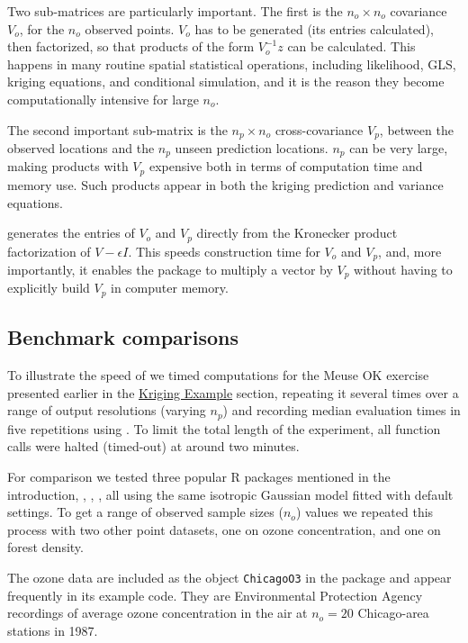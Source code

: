 Two sub-matrices are particularly important. The first is the \(n_o \times n_o\) covariance \(V_o\), for the \(n_o\) observed points. \(V_o\) has to be generated (its entries calculated), then factorized, so that products of the form \(V_o^{-1} z\) can be calculated. This happens in many routine spatial statistical operations, including likelihood, GLS, kriging equations, and conditional simulation, and it is the reason they become computationally intensive for large \(n_o\).

The second important sub-matrix is the \(n_p \times n_o\) cross-covariance \(V_p\), between the observed locations and the \(n_p\) unseen prediction locations. \(n_p\) can be very large, making products with \(V_p\) expensive both in terms of computation time and memory use. Such products appear in both the kriging prediction and variance equations.

 generates the entries of \(V_o\) and \(V_p\) directly from the Kronecker product factorization of \(V - \epsilon I\). This speeds construction time for \(V_o\) and \(V_p\), and, more importantly, it enables the package to multiply a vector by \(V_p\) without having to explicitly build \(V_p\) in computer memory.

\hypertarget{benchmark-comparisons}{%
\subsection{Benchmark comparisons}\label{benchmark-comparisons}}

To illustrate the speed of  we timed computations for the Meuse OK exercise presented earlier in the \protect\hyperlink{kriging-example}{Kriging Example} section, repeating it several times over a range of output resolutions (varying \(n_p\)) and recording median evaluation times in five repetitions using  \citep{mersmann2021micro}. To limit the total length of the experiment, all function calls were halted (timed-out) at around two minutes.

For comparison we tested three popular R packages mentioned in the introduction, , , , all using the same isotropic Gaussian model fitted with default settings. To get a range of observed sample sizes (\(n_o\)) values we repeated this process with two other point datasets, one on ozone concentration, and one on forest density.

The ozone data are included as the object \texttt{ChicagoO3} in the  package \citep{nychka2021fields} and appear frequently in its example code. They are Environmental Protection Agency recordings of average ozone concentration in the air at \(n_o=20\) Chicago-area stations in 1987.

